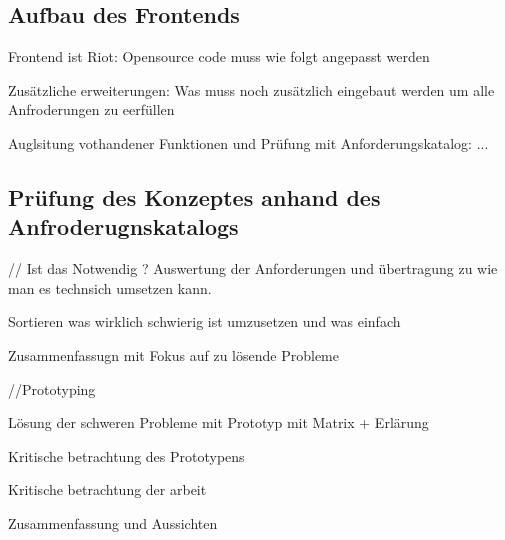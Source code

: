 \subsection{Aufbau des Frontends}\label{chapter:vdmf}
Frontend ist Riot: Opensource code muss wie folgt angepasst werden

Zusätzliche erweiterungen:
Was muss noch zusätzlich eingebaut werden um alle Anfroderungen zu eerfüllen 

Auglsitung vothandener Funktionen und Prüfung mit Anforderungskatalog:
...

\subsection{Prüfung des Konzeptes anhand des Anfroderugnskatalogs}\label{chapter:vdmf}
// Ist das Notwendig ?
Auswertung der Anforderungen und übertragung zu wie man es technsich umsetzen kann.

Sortieren was wirklich schwierig ist umzusetzen und was einfach

Zusammenfassugn mit Fokus auf zu lösende Probleme

//Prototyping

Lösung der schweren Probleme mit Prototyp mit Matrix + Erlärung 

Kritische betrachtung des Prototypens 

Kritische betrachtung der arbeit

Zusammenfassung und Aussichten
